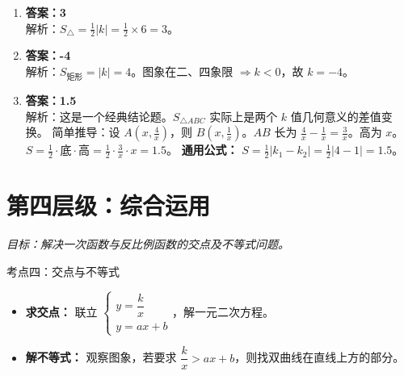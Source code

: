 \documentclass[12pt, a4paper]{article}
\begin{document}
\begin{answerbox}
    \begin{enumerate}
        \item \textbf{答案：3} \\
        解析：$S_{\triangle} = \frac{1}{2}|k| = \frac{1}{2} \times 6 = 3$。
        
        \item \textbf{答案：-4} \\
        解析：$S_{\text{矩形}} = |k| = 4$。图象在二、四象限 $\Rightarrow k < 0$，故 $k = -4$。
        
        \item \textbf{答案：1.5} \\
        解析：这是一个经典结论题。$S_{\triangle ABC}$ 实际上是两个 $k$ 值几何意义的差值变换。
        简单推导：设 $A(x, \frac{4}{x})$，则 $B(x, \frac{1}{x})$。$AB$ 长为 $\frac{4}{x} - \frac{1}{x} = \frac{3}{x}$。高为 $x$。
        $S = \frac{1}{2} \cdot \text{底} \cdot \text{高} = \frac{1}{2} \cdot \frac{3}{x} \cdot x = 1.5$。
        \textbf{通用公式：} $S = \frac{1}{2}|k_1 - k_2| = \frac{1}{2}|4-1| = 1.5$。
    \end{enumerate}
\end{answerbox}

\section{第四层级：综合运用}
\textit{目标：解决一次函数与反比例函数的交点及不等式问题。}

\begin{conceptbox}{考点四：交点与不等式}
    \begin{itemize}
        \item \textbf{求交点：} 联立 $\begin{cases} y = \dfrac{k}{x} \\ y = ax+b \end{cases}$，解一元二次方程。
        \item \textbf{解不等式：} 观察图象，若要求 $\dfrac{k}{x} > ax+b$，则找双曲线在直线上方的部分。
    \end{itemize}
\end{conceptbox}
\end{document}
